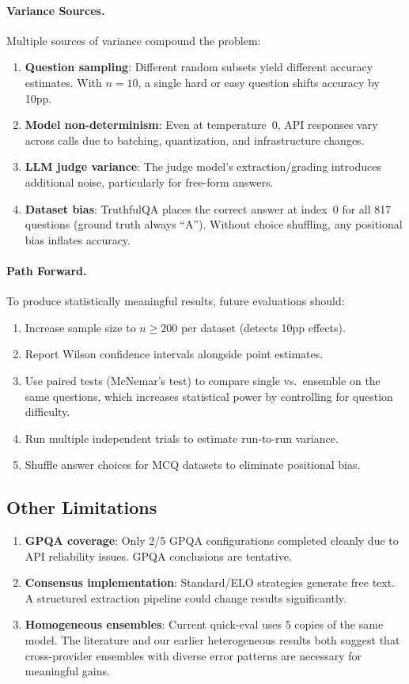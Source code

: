 \documentclass[11pt,a4paper]{article}
\begin{document}
\paragraph{Variance Sources.}
Multiple sources of variance compound the problem:
\begin{enumerate}
    \item \textbf{Question sampling}: Different random subsets yield different accuracy estimates. With $n=10$, a single hard or easy question shifts accuracy by 10pp.
    \item \textbf{Model non-determinism}: Even at temperature~0, API responses vary across calls due to batching, quantization, and infrastructure changes.
    \item \textbf{LLM judge variance}: The judge model's extraction/grading introduces additional noise, particularly for free-form answers.
    \item \textbf{Dataset bias}: TruthfulQA places the correct answer at index~0 for all 817 questions (ground truth always ``A''). Without choice shuffling, any positional bias inflates accuracy.
\end{enumerate}

\paragraph{Path Forward.}
To produce statistically meaningful results, future evaluations should:
\begin{enumerate}
    \item Increase sample size to $n \geq 200$ per dataset (detects 10pp effects).
    \item Report Wilson confidence intervals alongside point estimates.
    \item Use paired tests (McNemar's test) to compare single vs.\ ensemble on the same questions, which increases statistical power by controlling for question difficulty.
    \item Run multiple independent trials to estimate run-to-run variance.
    \item Shuffle answer choices for MCQ datasets to eliminate positional bias.
\end{enumerate}

\subsection{Other Limitations}

\begin{enumerate}
    \item \textbf{GPQA coverage}: Only 2/5 GPQA configurations completed cleanly due to API reliability issues. GPQA conclusions are tentative.
    \item \textbf{Consensus implementation}: Standard/ELO strategies generate free text. A structured extraction pipeline could change results significantly.
    \item \textbf{Homogeneous ensembles}: Current quick-eval uses 5 copies of the same model. The literature and our earlier heterogeneous results both suggest that cross-provider ensembles with diverse error patterns are necessary for meaningful gains.
\end{enumerate}
\end{document}
